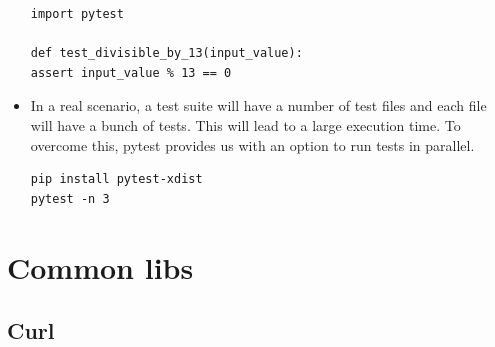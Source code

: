 \documentclass[a4paper,11pt,twoside]{book}
\begin{document}
\begin{itemize}
\begin{lstlisting}
import pytest

def test_divisible_by_13(input_value):
assert input_value % 13 == 0
\end{lstlisting}

\item In a real scenario, a test suite will have a number of test files and each file will have a bunch of tests. This will lead to a large execution time. To overcome this, pytest provides us with an option to run tests in parallel.

\begin{lstlisting}
pip install pytest-xdist
pytest -n 3
\end{lstlisting}




\end{itemize}

\chapter{Common libs}

\section{Curl}
\end{document}
